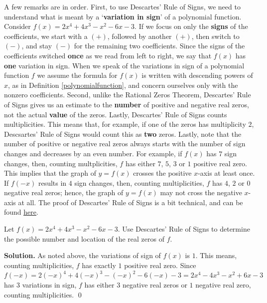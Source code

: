 \documentclass{ximera}
\begin{document}
A few remarks are in order. First, to use Descartes' Rule of Signs, we need to understand what is meant by a `\textbf{variation in sign}' of a polynomial function.  Consider $f(x) = 2x^4+4x^3-x^2-6x-3$.  If we focus on only the \textbf{signs} of the coefficients, we start with a $(+)$, followed by another $(+)$, then switch to $(-)$, and stay $(-)$ for the remaining two coefficients.  Since the signs of the coefficients switched \textbf{once} as we read from left to right, we say that $f(x)$ has \textbf{one} variation in sign.  When we speak of the variations in sign of a polynomial function $f$ we assume the formula for $f(x)$ is written with descending powers of $x$, as in Definition \ref{polynomialfunction}, and concern ourselves only with the nonzero coefficients.  Second, unlike the Rational Zeros Theorem, Descartes' Rule of Signs gives us an estimate to the \textbf{number} of positive and negative real zeros, not the actual \textbf{value} of the zeros. Lastly, Descartes' Rule of Signs counts multiplicities.  This means that, for example, if one of the zeros has multiplicity $2$, Descsartes' Rule of Signs would count this as \textbf{two} zeros.  Lastly, note that the number of positive or negative real zeros always starts with the number of sign changes and decreases by an even number.  For example, if $f(x)$ has $7$ sign changes, then, counting multplicities, $f$ has either $7$, $5$, $3$ or $1$ positive real zero.  This implies that the graph of $y=f(x)$ crosses the positive $x$-axis at least once.  If $f(-x)$ results in $4$ sign changes, then, counting multiplicities, $f$ has $4$, $2$ or $0$ negative real zeros;  hence, the graph of $y=f(x)$ may not cross the negative $x$-axis at all.  The proof of Descartes' Rule of Signs is a bit technical, and can be found \href{http://www.cut-the-knot.org/fta/ROS2.shtml}{\underline{here}}. 

\begin{example}  Let $f(x) = 2x^4+4x^3-x^2-6x-3$.  Use Descartes' Rule of Signs to determine the possible number and location of the real zeros of $f$.

\smallskip

{\bf Solution.}  As noted above, the variations of sign of $f(x)$ is $1$. This means, counting multiplicities, $f$ has exactly $1$ positive real zero.  Since $f(-x)=2(-x)^4+4(-x)^3-(-x)^2-6(-x)-3=2x^4-4x^3-x^2+6x-3$ has $3$ variations in sign, $f$ has either $3$ negative real zeros or $1$ negative real zero, counting multiplicities. \qed

\label{DRSex}

\end{example}
\end{document}
